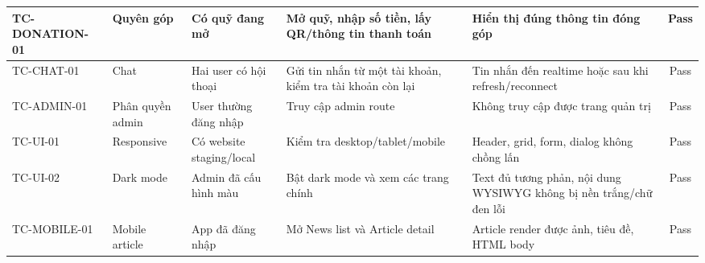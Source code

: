 \documentclass[12pt,a4paper,oneside]{report}
\begin{document}
{\begin{longtable}{|>{\raggedright\arraybackslash}p{2.3cm}|>{\raggedright\arraybackslash}p{2.1cm}|>{\raggedright\arraybackslash}p{2.6cm}|>{\raggedright\arraybackslash}p{3.4cm}|>{\raggedright\arraybackslash}p{3.6cm}|c|}
TC-DONATION-01 & Quyên góp & Có quỹ đang mở & Mở quỹ, nhập số tiền, lấy QR/thông tin thanh toán & Hiển thị đúng thông tin đóng góp & Pass \\ \hline
TC-CHAT-01 & Chat & Hai user có hội thoại & Gửi tin nhắn từ một tài khoản, kiểm tra tài khoản còn lại & Tin nhắn đến realtime hoặc sau khi refresh/reconnect & Pass \\ \hline
TC-ADMIN-01 & Phân quyền admin & User thường đăng nhập & Truy cập admin route & Không truy cập được trang quản trị & Pass \\ \hline
TC-UI-01 & Responsive & Có website staging/local & Kiểm tra desktop/tablet/mobile & Header, grid, form, dialog không chồng lấn & Pass \\ \hline
TC-UI-02 & Dark mode & Admin đã cấu hình màu & Bật dark mode và xem các trang chính & Text đủ tương phản, nội dung WYSIWYG không bị nền trắng/chữ đen lỗi & Pass \\ \hline
TC-MOBILE-01 & Mobile article & App đã đăng nhập & Mở News list và Article detail & Article render được ảnh, tiêu đề, HTML body & Pass \\ \hline
\end{longtable}
}
\renewcommand{\arraystretch}{1}
\end{document}
